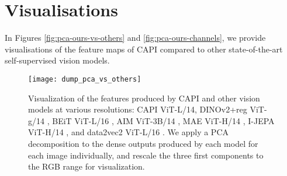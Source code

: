 


\section{Visualisations}

In Figures \autoref{fig:pca-ours-vs-others} and \ref{fig:pca-ours-channels}, we provide visualisations of the feature maps of CAPI compared to other state-of-the-art self-supervised vision models.

\begin{figure*}
  \centering
  \texttt{[image: dump\_pca\_vs\_others]}
  \caption{Visualization of the features produced by CAPI and other vision models at various resolutions:
  CAPI ViT-L/14,
  DINOv2+reg ViT-g/14 \citep{vitneedreg},
  BEiT ViT-L/16 \citep{beit},
  AIM ViT-3B/14 \citep{aim},
  MAE ViT-H/14 \citep{aim},
  I-JEPA ViT-H/14 \citep{ijepa},
  and data2vec2 ViT-L/16 \citep{data2vec}.
  We apply a PCA decomposition to the dense outputs produced by each model for each image individually, and rescale the three first components to the RGB range for visualization.
  }
  \label{fig:pca-ours-vs-others}
\end{figure*}



